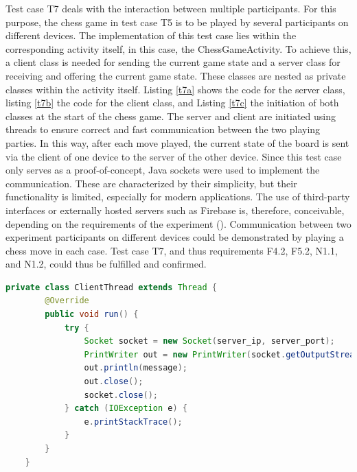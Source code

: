 Test case T7 deals with the interaction between multiple participants. For this purpose, the chess game in test case T5 is to be played by several participants on different devices. The implementation of this test case lies within the corresponding activity itself, in this case, the ChessGameActivity. To achieve this, a client class is needed for sending the current game state and a server class for receiving and offering the current game state. These classes are nested as private classes within the activity itself. Listing \ref{t7a} shows the code for the server class, listing \ref{t7b} the code for the client class, and Listing \ref{t7c} the initiation of both classes at the start of the chess game. The server and client are initiated using threads to ensure correct and fast communication between the two playing parties. In this way, after each move played, the current state of the board is sent via the client of one device to the server of the other device. Since this test case only serves as a proof-of-concept, Java sockets were used to implement the communication. These are characterized by their simplicity, but their functionality is limited, especially for modern applications. The use of third-party interfaces or externally hosted servers such as Firebase is, therefore, conceivable, depending on the requirements of the experiment (\cite{Google.2023b}). Communication between two experiment participants on different devices could be demonstrated by playing a chess move in each case. Test case T7, and thus requirements F4.2, F5.2, N1.1, and N1.2, could thus be fulfilled and confirmed.


\vspace{0.5cm}

\begin{lstlisting}[language=java,label=t7b,lineskip={0pt}, caption=T7: Server Code, basicstyle=\scriptsize, captionpos=b]
    private class ClientThread extends Thread {
        @Override
        public void run() {
            try {
                Socket socket = new Socket(server_ip, server_port);
                PrintWriter out = new PrintWriter(socket.getOutputStream(), true);
                out.println(message);
                out.close();
                socket.close();
            } catch (IOException e) {
                e.printStackTrace();
            }
        }
    }
\end{lstlisting}

